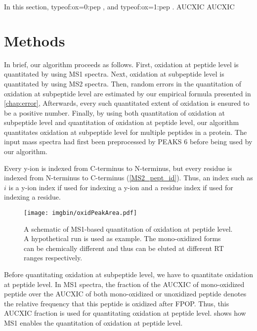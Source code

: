 In this section,
	\gls{typeof:ox=0:pep} ,
	and \gls{typeof:ox=1:pep} .
\Gls{AUCXIC} \glsdesc*{AUCXIC} %

\section{Methods}
\label{sec:oxlvl:methods}

In brief, our algorithm proceeds as follows.
First, oxidation at peptide level is quantitated by using \gls{MS1} spectra.
Next, oxidation at subpeptide level is quantitated by using \gls{MS2} spectra.
Then, random errors in the quantitation of oxidation at subpeptide level are estimated by our empirical formula presented in \cref{chap:error},
Afterwards, every such quantitated extent of oxidation is ensured to be a positive number.
Finally, by using both quantitation of oxidation at subpeptide level and quantitation of oxidation at peptide level,
	our algorithm quantitates oxidation at subpeptide level for multiple peptides in a protein.
The input mass spectra had first been preprocessed by PEAKS 6 \cite{ma2003peaks} before being used by our algorithm.				

Every y-ion is indexed from C-terminus to N-terminus, but every residue is indexed from N-terminus to C-terminus (\cref{MS2_pept_id}).
Thus, an index such as \(i\) is a y-ion index if used for indexing a y-ion and a residue index if used for indexing a residue.

\begin{figure}
\texttt{[image: imgbin/oxidPeakArea.pdf]}
\caption[
	A schematic of \gls{MS1}-based quantitation of oxidation at peptide level.]{
	A schematic of \gls{MS1}-based quantitation of oxidation at peptide level.
	A hypothetical run is used as example.
	The \gls{mono-oxidized} forms can be chemically different and thus can be eluted at different \gls{RT} ranges respectively.
	\label{fig:OX:methods:quntitationMS1}
}
\end{figure}	
Before quantitating oxidation at subpeptide level, we have to quantitate oxidation at peptide level.
In \gls{MS1} spectra, 
	the fraction of the \gls{AUCXIC} of \gls{mono-oxidized} peptide over the \gls{AUCXIC} of both \gls{mono-oxidized} or unoxidized peptide denotes the relative frequency that this peptide is oxidized after \gls{FPOP}.
Thus, this \gls{AUCXIC} fraction is used for quantitating oxidation at peptide level.
 shows how \gls{MS1} enables the quantitation of oxidation at peptide level.
	
